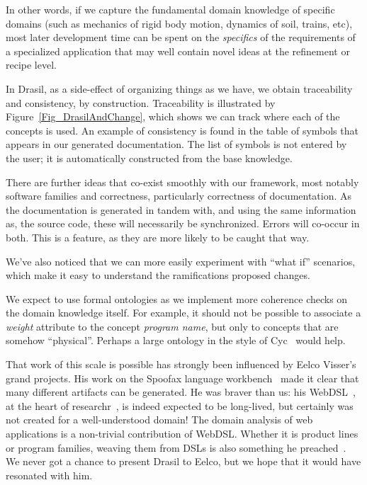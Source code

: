 \documentclass[a4paper,UKenglish,cleveref,autoref,thm-restate]{oasics-v2021}
\begin{document}
In other words, if we capture the fundamental domain knowledge of specific
domains (such as mechanics of rigid body motion, dynamics of soil, trains,
etc), most later development time can be spent on the \emph{specifics} of the
requirements of a specialized application that may well contain novel ideas at
the refinement or recipe level.

In Drasil, as a side-effect of organizing things as we have, we obtain
traceability and consistency, by construction.  Traceability is illustrated by
Figure~\ref{Fig_DrasilAndChange}, which shows we can track where each of the
concepts is used.  An example of consistency is found in the table of symbols
that appears in our generated documentation.  The list of symbols is not
entered by the user; it is automatically constructed from the base knowledge.

There are further ideas that co-exist smoothly with our framework, most notably
software families and correctness, particularly correctness of documentation.  
As the documentation is generated in tandem with, and using the same information as,
the source code, these will necessarily be synchronized. Errors will co-occur in both.
This is a feature, as they are more likely to be caught that way.

We've also noticed that we can more easily experiment with ``what if'' scenarios,
which make it easy to understand the ramifications proposed changes.  

We expect to use formal ontologies as we implement
more coherence checks on the domain knowledge itself. For example, it should not
be possible to associate a \textit{weight} attribute to the concept
\textit{program name}, but only to concepts that are somehow ``physical''. 
Perhaps a large ontology in the style of Cyc~\cite{lenat1995cyc} would help.

That work of this scale is possible has strongly been influenced by Eelco
Visser's grand projects. His work on the Spoofax language workbench~\cite{Spoofax}
made it clear that many different artifacts can be generated. He was braver than
us: his WebDSL~\cite{WebDSL}, at the heart of researchr~\cite{researchr}, is
indeed expected to be long-lived, but certainly was not created for a
well-understood domain! The domain analysis of web applications is a non-trivial
contribution of WebDSL. Whether it is product lines or program families, weaving
them from DSLs is also something he preached~\cite{voelter2011product}.
We never got a chance to present Drasil to Eelco, but we hope that it would
have resonated with him.



\end{document}
